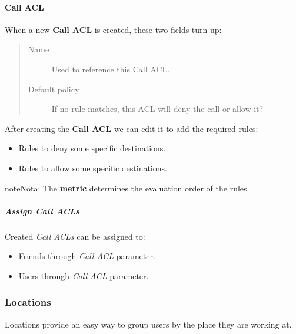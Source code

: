 \documentclass[letterpaper,10pt,spanish]{sphinxmanual}
\begin{document}
\paragraph{Call ACL}
\label{administration_portal/client/vpbx/user_configuration/call_acls:call-acl}
When a new \textbf{Call ACL} is created, these two fields turn up:
\begin{quote}
\begin{description}
\item[{Name}] \leavevmode
Used to reference this Call ACL.

\item[{Default policy}] \leavevmode
If no rule matches, this ACL will deny the call or allow it?

\end{description}
\end{quote}

After creating the \textbf{Call ACL} we can edit it to add the required rules:
\begin{itemize}
\item {} 
Rules to deny some specific destinations.

\item {} 
Rules to allow some specific destinations.

\end{itemize}

\begin{notice}{note}{Nota:}
The \textbf{metric} determines the evaluation order of the rules.
\end{notice}


\subparagraph{Assign Call ACLs}
\label{administration_portal/client/vpbx/user_configuration/call_acls:assign-call-acls}
Created \emph{Call ACLs} can be assigned to:
\begin{itemize}
\item {} 
Friends through \emph{Call ACL} parameter.

\item {} 
Users through \emph{Call ACL} parameter.

\end{itemize}


\subsubsection{Locations}
\label{administration_portal/client/vpbx/user_configuration/locations::doc}\label{administration_portal/client/vpbx/user_configuration/locations:locations}
Locations provide an easy way to group users by the place they are working at.
\end{document}
